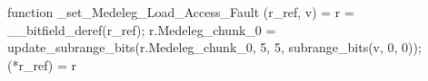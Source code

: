 function _set_Medeleg_Load_Access_Fault (r_ref, v) = {
    r = __bitfield_deref(r_ref);
    r.Medeleg_chunk_0 = update_subrange_bits(r.Medeleg_chunk_0, 5, 5, subrange_bits(v, 0, 0));
    (*r_ref) = r
}
